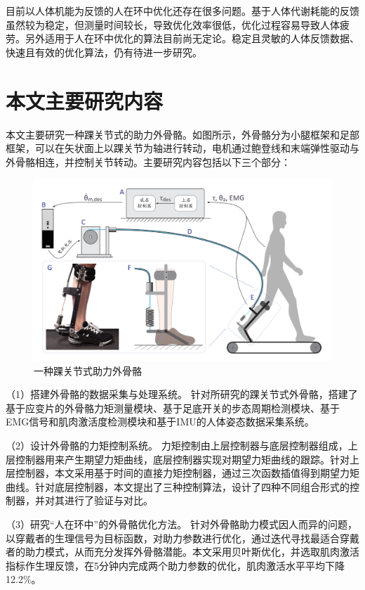 目前以人体机能为反馈的人在环中优化还存在很多问题。基于人体代谢耗能的反馈虽然较为稳定，但测量时间较长，导致优化效率很低，优化过程容易导致人体疲劳。另外适用于人在环中优化的算法目前尚无定论。稳定且灵敏的人体反馈数据、快速且有效的优化算法，仍有待进一步研究。

\section{本文主要研究内容}

本文主要研究一种踝关节式的助力外骨骼\cite{p42}。如图所示，外骨骼分为小腿框架和足部框架，可以在矢状面上以踝关节为轴进行转动，电机通过鲍登线和末端弹性驱动与外骨骼相连，并控制关节转动。主要研究内容包括以下三个部分：

\begin{figure}[htb]
    \includegraphics[width=15cm]{fig/f19.png}
    \caption{一种踝关节式助力外骨骼\cite{p43}}
    \label{fig:mark}
\end{figure}

（1）搭建外骨骼的数据采集与处理系统。
针对所研究的踝关节式外骨骼，搭建了基于应变片的外骨骼力矩测量模块、基于足底开关的步态周期检测模块、基于EMG信号和肌肉激活度检测模块和基于IMU的人体姿态数据采集系统。

（2）设计外骨骼的力矩控制系统。
力矩控制由上层控制器与底层控制器组成，上层控制器用来产生期望力矩曲线，底层控制器实现对期望力矩曲线的跟踪。针对上层控制器，本文采用基于时间的直接力矩控制器，通过三次函数插值得到期望力矩曲线。针对底层控制器，本文提出了三种控制算法，设计了四种不同组合形式的控制器，并对其进行了验证与对比。

（3）研究“人在环中”的外骨骼优化方法。
针对外骨骼助力模式因人而异的问题，以穿戴者的生理信号为目标函数，对助力参数进行优化，通过迭代寻找最适合穿戴者的助力模式，从而充分发挥外骨骼潜能。本文采用贝叶斯优化，并选取肌肉激活指标作生理反馈，在5分钟内完成两个助力参数的优化，肌肉激活水平平均下降12.2\%。